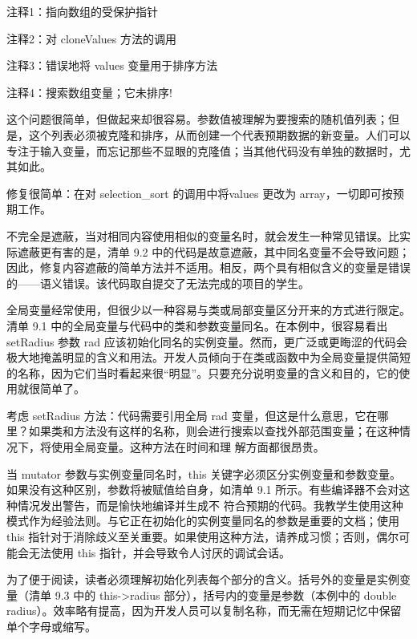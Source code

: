 {\footnotesize
注释1：指向数组的受保护指针

注释2：对 cloneValues 方法的调用

注释3：错误地将 values 变量用于排序方法

注释4：搜索数组变量；它未排序!
}

这个问题很简单，但做起来却很容易。参数值被理解为要搜索的随机值列表；但是，这个列表必须被克隆和排序，从而创建一个代表预期数据的新变量。人们可以专注于输入变量，而忘记那些不显眼的克隆值；当其他代码没有单独的数据时，尤其如此。

修复很简单：在对 selection\_sort 的调用中将values 更改为 array，一切即可按预期工作。

不完全是遮蔽，当对相同内容使用相似的变量名时，就会发生一种常见错误。比实际遮蔽更有害的是，清单 9.2 中的代码是故意遮蔽，其中同名变量不会导致问题；因此，修复内容遮蔽的简单方法并不适用。相反，两个具有相似含义的变量是错误的——语义错误。该代码取自提交了无法完成的项目的学生。


全局变量经常使用，但很少以一种容易与类或局部变量区分开来的方式进行限定。清单 9.1 中的全局变量与代码中的类和参数变量同名。在本例中，很容易看出 setRadius 参数 rad 应该初始化同名的实例变量。然而，更广泛或更晦涩的代码会极大地掩盖明显的含义和用法。开发人员倾向于在类或函数中为全局变量提供简短的名称，因为它们当时看起来很“明显”。只要充分说明变量的含义和目的，它的使用就很简单了。

考虑 setRadius 方法：代码需要引用全局 rad 变量，但这是什么意思，它在哪里？如果类和方法没有这样的名称，则会进行搜索以查找外部范围变量；在这种情况下，将使用全局变量。这种方法在时间和理 解方面都很昂贵。

当 mutator 参数与实例变量同名时，this 关键字必须区分实例变量和参数变量。如果没有这种区别，参数将被赋值给自身，如清单 9.1 所示。有些编译器不会对这种情况发出警告，而是愉快地编译并生成不 符合预期的代码。我教学生使用这种模式作为经验法则。与它正在初始化的实例变量同名的参数是重要的文档；使用 this 指针对于消除歧义至关重要。如果使用这种方法，请养成习惯；否则，偶尔可能会无法使用 this 指针，并会导致令人讨厌的调试会话。


为了便于阅读，读者必须理解初始化列表每个部分的含义。括号外的变量是实例变量（清单 9.3 中的 this->radius 部分），括号内的变量是参数（本例中的 double radius）。效率略有提高，因为开发人员可以复制名称，而无需在短期记忆中保留单个字母或缩写。


